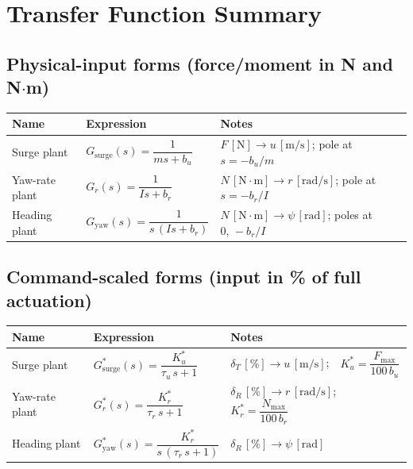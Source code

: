 \documentclass[11pt]{article}
\begin{document}
\section{Transfer Function Summary}

\subsection*{Physical-input forms (force/moment in N and N$\cdot$m)}
\begin{center}
\begin{tabular}{L{3.0cm} L{5.5cm} L{4.7cm}}
  \textbf{Name} & \textbf{Expression} & \textbf{Notes} \\
  \midrule
  Surge plant &
    $\displaystyle G_{\mathrm{surge}}(s) = \dfrac{1}{ms + b_u}$ &
    $F\,[\mathrm{N}] \to u\,[\mathrm{m/s}]$; pole at $s=-b_u/m$ \\[10pt]

  Yaw-rate plant &
    $\displaystyle G_r(s) = \dfrac{1}{Is + b_r}$ &
    $N\,[\mathrm{N{\cdot}m}] \to r\,[\mathrm{rad/s}]$; pole at $s=-b_r/I$ \\[10pt]

  Heading plant &
    $\displaystyle G_{\mathrm{yaw}}(s) = \dfrac{1}{s\,(Is + b_r)}$ &
    $N\,[\mathrm{N{\cdot}m}] \to \psi\,[\mathrm{rad}]$; poles at $0,\,-b_r/I$ \\[10pt]
  \bottomrule
\end{tabular}
\end{center}

\subsection*{Command-scaled forms (input in \% of full actuation)}
\begin{center}
\begin{tabular}{L{3.0cm} L{5.5cm} L{4.7cm}}
  \textbf{Name} & \textbf{Expression} & \textbf{Notes} \\
  \midrule
  Surge plant &
    $\displaystyle G_{\mathrm{surge}}^*(s) = \dfrac{K_u^*}{\tau_u\,s + 1}$ &
    $\delta_T\,[\%] \to u\,[\mathrm{m/s}]$;\ \ $K_u^* = \dfrac{F_{\max}}{100\,b_u}$ \\[12pt]

  Yaw-rate plant &
    $\displaystyle G_r^*(s) = \dfrac{K_r^*}{\tau_r\,s + 1}$ &
    $\delta_R\,[\%] \to r\,[\mathrm{rad/s}]$;\ \ $K_r^* = \dfrac{N_{\max}}{100\,b_r}$ \\[12pt]

  Heading plant &
    $\displaystyle G_{\mathrm{yaw}}^*(s) = \dfrac{K_r^*}{s\,(\tau_r\,s + 1)}$ &
    $\delta_R\,[\%] \to \psi\,[\mathrm{rad}]$ \\[10pt]
  \bottomrule
\end{tabular}
\end{center}
\end{document}
